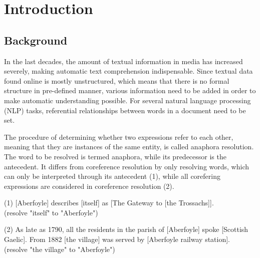 \chapter{Introduction}
\label{sec:Introduction}

\section{Background}

In the last decades, the amount of textual information in media has increased severely, making automatic text comprehension indispensable. Since textual data found online is mostly unstructured, which means that there is no formal structure in pre-defined manner, various information need to be added in order to make automatic understanding possible. For several natural language processing (NLP) tasks, referential relationships between words  in a document need to be set. 

The procedure of determining whether two expressions  refer to each other, meaning that they are instances of the same entity, is called anaphora resolution. The word to be resolved is termed anaphora, while its predecessor is the antecedent. It differs from coreference resolution by only resolving words, which can only be interpreted through its antecedent \citep{recasens2007anaphora} (1), while all corefering expressions are considered in coreference resolution (2).

(1) [Aberfoyle] describes [itself] as [The Gateway to [the Trossachs]]. \\
(resolve "itself" to "Aberfoyle")

(2) As late as 1790, all the residents in the parish of [Aberfoyle] spoke [Scottish Gaelic]. From 1882 [the village] was served by [Aberfoyle railway station].\\
(resolve "the village"  to "Aberfoyle")

